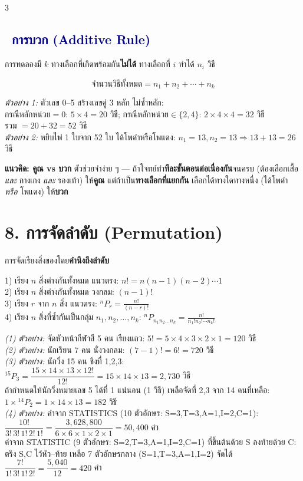 \documentclass[9pt]{extarticle}
\newcommand{\dist}[1]{\subsection*{\textcolor{navy}{\textbullet\ #1}}}
\begin{document}
\begin{multicols}{3}
\dist{การบวก (Additive Rule)}
การทดลองมี $k$ ทางเลือกที่เกิดพร้อมกัน\textbf{ไม่ได้} ทางเลือกที่ $i$ ทำได้ $n_i$ วิธี
\begin{formulabox}
$$\text{จำนวนวิธีทั้งหมด}=n_1+n_2+\cdots+n_k$$
\end{formulabox}
\begin{solbox}
\textit{ตัวอย่าง 1:} ตัวเลข 0--5 สร้างเลขคู่ 3 หลัก ไม่ซ้ำหลัก:\\
กรณีหลักหน่วย$=0$: $5{\times}4=20$ วิธี; กรณีหลักหน่วย$\in\{2,4\}$: $2{\times}4{\times}4=32$ วิธี\\
รวม $=20+32=52$ วิธี\\[3pt]
\textit{ตัวอย่าง 2:} หยิบไพ่ 1 ใบจาก 52 ใบ ได้โพดำหรือโพแดง: $n_1{=}13,n_2{=}13\Rightarrow13{+}13{=}26$ วิธี
\end{solbox}
\begin{ideabox}
\textbf{แนวคิด: คูณ vs บวก} ตัวช่วยจำง่าย ๆ — ถ้าโจทย์ทำ\textbf{ทีละขั้นตอนต่อเนื่องกัน}จนครบ (ต้องเลือกเสื้อ \textit{และ} กางเกง \textit{และ} รองเท้า) ให้\textbf{คูณ} แต่ถ้าเป็น\textbf{ทางเลือกที่แยกกัน} เลือกได้ทางใดทางหนึ่ง (ได้โพดำ \textit{หรือ} โพแดง) ให้\textbf{บวก}
\end{ideabox}

\section*{8. การจัดลำดับ (Permutation)}
การจัดเรียงสิ่งของโดย\textbf{คำนึงถึงลำดับ}
\begin{formulabox}
1) เรียง $n$ สิ่งต่างกันทั้งหมด แนวตรง: $n!=n(n{-}1)(n{-}2)\cdots1$\\
2) เรียง $n$ สิ่งต่างกันทั้งหมด วงกลม: $(n-1)!$\\
3) เรียง $r$ จาก $n$ สิ่ง แนวตรง: $\displaystyle{}^nP_r=\frac{n!}{(n-r)!}$\\
4) เรียง $n$ สิ่งที่ซ้ำกันเป็นกลุ่ม $n_1,n_2,\dots,n_k$: $\displaystyle{}^nP_{n_1n_2\dots n_k}=\frac{n!}{n_1!n_2!\cdots n_k!}$
\end{formulabox}
\begin{solbox}
\textit{(1) ตัวอย่าง:} จัดหัวหน้ากีฬาสี 5 คน เรียงแถว: $5!=5{\times}4{\times}3{\times}2{\times}1=120$ วิธี\\[3pt]
\textit{(2) ตัวอย่าง:} นักเรียน 7 คน นั่งวงกลม: $(7-1)!=6!=720$ วิธี\\[3pt]
\textit{(3) ตัวอย่าง:} นักวิ่ง 15 คน ชิงที่ 1,2,3: ${}^{15}P_3=\dfrac{15{\times}14{\times}13{\times}12!}{12!}=15{\times}14{\times}13=2{,}730$ วิธี\\
ถ้ากำหนดให้นักวิ่งหมายเลข 5 ได้ที่ 1 แน่นอน (1 วิธี) เหลือจัดที่ 2,3 จาก 14 คนที่เหลือ: $1{\times}{}^{14}P_2=1{\times}14{\times}13=182$ วิธี\\[3pt]
\textit{(4) ตัวอย่าง:} คำจาก STATISTICS (10 ตัวอักษร: S=3,T=3,A=1,I=2,C=1):\\
$\dfrac{10!}{3!\,3!\,1!\,2!\,1!}=\dfrac{3{,}628{,}800}{6{\times}6{\times}1{\times}2{\times}1}=50{,}400$ คำ\\
คำจาก STATISTIC (9 ตัวอักษร: S=2,T=3,A=1,I=2,C=1) ที่ขึ้นต้นด้วย S ลงท้ายด้วย C: ตรึง S,C ไว้หัว--ท้าย เหลือ 7 ตัวอักษรกลาง (S=1,T=3,A=1,I=2) จัดได้ $\dfrac{7!}{1!\,3!\,1!\,2!}=\dfrac{5{,}040}{12}=420$ คำ
\end{solbox}


\end{multicols}
\end{document}
